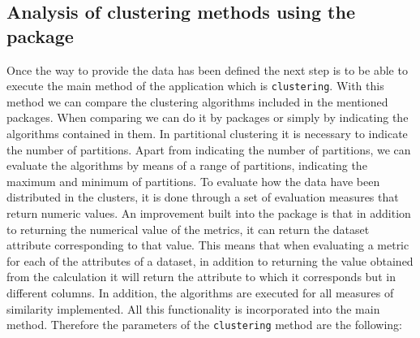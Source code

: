 \subsection {Analysis of clustering methods using the  package}

Once the way to provide the data has been defined the next step is to be able to execute the main method of the application which is \texttt{clustering}. With this method we can compare the clustering algorithms included in the mentioned packages. When comparing we can do it by packages or simply by indicating the algorithms contained in them. In partitional clustering it is necessary to indicate the number of partitions. Apart from indicating the number of partitions, we can evaluate the algorithms by means of a range of partitions, indicating the maximum and minimum of partitions. To evaluate how the data have been distributed in the clusters, it is done through a set of evaluation measures that return numeric values. An improvement built into the package is that in addition to returning the numerical value of the metrics, it can return the dataset attribute corresponding to that value. This means that when evaluating a metric for each of the attributes of a dataset, in addition to returning the value obtained from the calculation it will return the attribute to which it corresponds but in different columns. In addition, the algorithms are executed for all measures of similarity implemented. All this functionality is incorporated into the main method. Therefore the parameters of the \texttt{clustering} method are the following:
